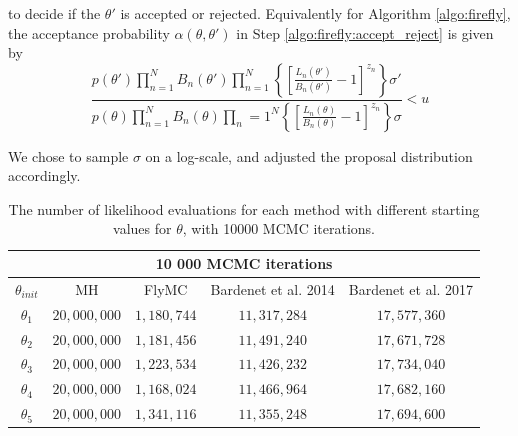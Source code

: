 to decide if the $\theta'$ is accepted or rejected. 
Equivalently for Algorithm \ref{algo:firefly}, the acceptance probability $\alpha\left(\theta, \theta'\right)$ in Step \ref{algo:firefly:accept_reject}  is given by
\begin{equation*}
 \frac{p\left(\theta'\right) \prod_{n=1}^N B_n\left(\theta'\right) \prod_{n=1}^N \left\{\left[\frac{L_n\left(\theta'\right)}{B_n\left(\theta'\right)} - 1\right]^{z_n}\right\} \sigma'}{p\left(\theta\right) \prod_{n=1}^N B_n\left(\theta\right) \prod_n=1^N\left\{\left[\frac{L_n\left(\theta\right)}{B_n\left(\theta\right)} - 1 \right] ^{z_n}\right\} \sigma} < u  
\end{equation*}

We chose to sample $\sigma$ on a log-scale, and adjusted the proposal distribution accordingly. 

\begin{table}[ht]
    \centering
\begin{tabular}{|c|c|c|c|c|}
  \hline
    \multicolumn{5}{|c|}{10 000 MCMC iterations} \\
    \hline
\hline
        $\theta_{init}$ &  MH & FlyMC & Bardenet et al. 2014 & Bardenet et al. 2017\\ 
         \hline \hline$\theta_1$ & $20,000,000$ & $1,180,744$ & $11,317,284$ & $17,577,360$ \\
        $\theta_2$ & $20,000,000$ & $1,181,456$ & $11,491,240$ & $17,671,728$ \\
        $\theta_3$ & $20,000,000$ & $1,223,534$ & $11,426,232$ & $17,734,040$
        \\ $ \theta_4$ & $20,000,000$ & $1,168,024$ & $11,466,964$ & $17,682,160$ \\
        $\theta_5$ &$20,000,000$&$1,341,116$&$11,355,248$&$17,694,600$
        \\ \hline
\end{tabular}
\caption{The number of likelihood evaluations for each method with different starting values for $\theta$, with 10000 MCMC iterations.}
\label{tab:ll_evals_10k_normal}
\end{table} 

